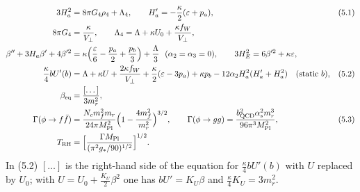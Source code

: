\documentclass[10pt,a4paper]{article}
\begin{document}
\begin{align*}
3H_a^2&=8\pi G_4\rho_4+\Lambda_4,\qquad H_a'=-\frac\kappa2(\varepsilon+p_a),&&(5.1) \\
8\pi G_4&=\frac\kappa{V_\perp},\qquad \Lambda_4=\Lambda+\kappa U_0+\frac{\kappa f_W}{V_\perp}, \\
\beta''+3H_a\beta'+4\beta'^2&=\kappa\Big(\frac\varepsilon6-\frac{p_a}2+\frac{p_b}3\Big)+\frac\Lambda3\ \ (\alpha_2=\alpha_3=0),\qquad 3H_E^2=6\beta'^2+\kappa\varepsilon, \\
\frac\kappa4bU'(b)&=\Lambda+\kappa U+\frac{2\kappa f_W}{V_\perp}+\frac\kappa2(\varepsilon-3p_a)+\kappa p_b-12\alpha_2H_a^2(H_a'+H_a^2)\quad(\text{static }b),&&(5.2) \\
\beta_{\rm eq}&=\frac{[\dots]}{3m_r^2}, \\
\Gamma(\phi\to f\bar f)&=\frac{N_cm_f^2m_r}{24\pi M_{\rm Pl}^2}\Big(1-\frac{4m_f^2}{m_r^2}\Big)^{3/2},\qquad \Gamma(\phi\to gg)=\frac{b_{\rm QCD}^2\alpha_s^2m_r^3}{96\pi^3M_{\rm Pl}^2},&&(5.3) \\
T_{\rm RH}&=\Big[\frac{\Gamma M_{\rm Pl}}{(\pi^2g_*/90)^{1/2}}\Big]^{1/2}.
\end{align*}
In (5.2) $[\dots]$ is the right-hand side of the equation for $\tfrac\kappa4bU'(b)$ with $U$ replaced by $U_0$; with $U=U_0+\tfrac{K_U}2\beta^2$ one has $bU'=K_U\beta$ and $\tfrac\kappa4K_U=3m_r^2$.
\end{document}
